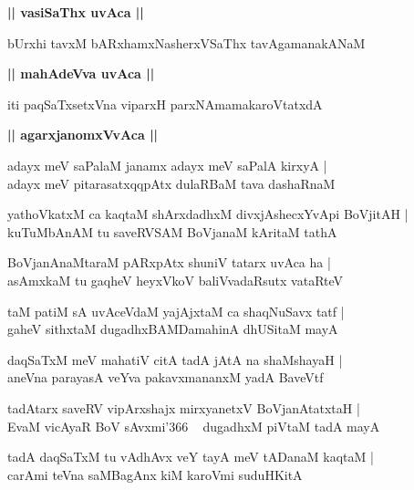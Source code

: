 \documentclass[twoside,12pt,openright]{book}
\newcounter{shloka}[chapter]
\def\uvaca#1{\centerline{{\large\textbf{#1}}}}
\begin{document}
\uvaca{|| vasiSaThx uvAca ||}

\begin{shloka}%
bUrxhi tavxM bARxhamxNasherxVSaThx tavAgamanakANaM 
\end{shloka}

\uvaca{|| mahAdeVva uvAca ||}

\begin{shloka}%
iti paqSaTxsetxVna viparxH parxNAmamakaroVtatxdA 
\end{shloka}

\uvaca{|| agarxjanomxVvAca ||}

\begin{shloka}%
adayx meV saPalaM janamx adayx meV saPalA kirxyA |\\
adayx meV pitarasatxqqpAtx dulaRBaM tava dashaRnaM 
\end{shloka}

\begin{shloka}%
yathoVkatxM ca kaqtaM shArxdadhxM divxjAshecxYvApi BoVjitAH |\\
kuTuMbAnAM tu saveRVSAM BoVjanaM kAritaM tathA 
\end{shloka}

\begin{shloka}%
BoVjanAnaMtaraM pARxpAtx shuniV tatarx uvAca ha |\\
asAmxkaM tu gaqheV heyxVkoV baliVvadaRsutx vataRteV
\end{shloka}

\begin{shloka}%
taM patiM sA uvAceVdaM yajAjxtaM ca shaqNuSavx tatf |\\
gaheV sithxtaM dugadhxBAMDamahinA dhUSitaM mayA 
\end{shloka}

\begin{shloka}%
daqSaTxM meV mahatiV citA tadA jAtA na shaMshayaH |\\
aneVna parayasA veYva pakavxmananxM yadA BaveVtf
\end{shloka}

\begin{shloka}%
tadAtarx saveRV vipArxshajx mirxyanetxV BoVjanAtatxtaH |\\
EvaM vicAyaR BoV sAvxmi\char'366 ~ dugadhxM piVtaM tadA mayA
\end{shloka}

\begin{shloka}%
tadA daqSaTxM tu vAdhAvx veY tayA meV tADanaM kaqtaM |\\
carAmi teVna saMBagAnx kiM karoVmi suduHKitA 
\end{shloka}
\end{document}
